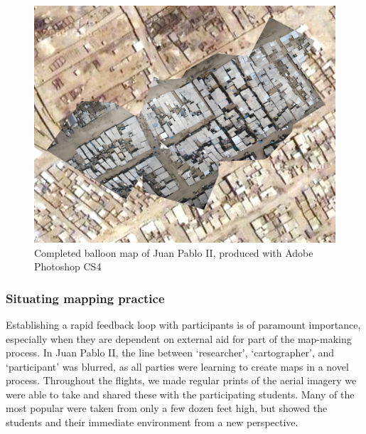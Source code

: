\documentclass[11pt,oneside,notitlepage]{report}
\begin{document}
\begin{figure}[h]
  \begin{center}
	\includegraphics[width=1\textwidth]{images/juan-pablo-final.jpg}
	\caption{Completed balloon map of Juan Pablo II, produced with Adobe Photoshop CS4}
  \end{center}
\end{figure}

\subsubsection{Situating mapping practice}

Establishing a rapid feedback loop with participants is of paramount importance, especially when they are dependent on external aid for part of the map-making process. In Juan Pablo II, the line between `researcher', `cartographer', and `participant' was blurred, as all parties were learning to create maps in a novel process. Throughout the flights, we made regular prints of the aerial imagery we were able to take and shared these with the participating students. Many of the most popular were taken from only a few dozen feet high, but showed the students and their immediate environment from a new perspective. 
\end{document}
